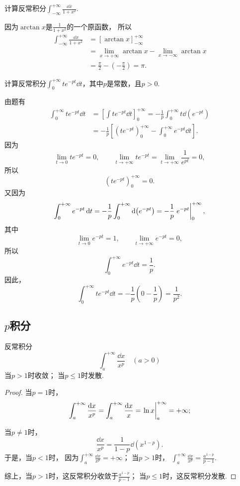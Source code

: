 \begin{example}
计算反常积分\(\int_{-\infty}^{+\infty} \frac{\dd{x}}{1+x^2}\).
\begin{solution}
因为\(\arctan x\)是\(\frac{1}{1+x^2}\)的一个原函数，
所以\[
	\begin{split}
		\int_{-\infty}^{+\infty} \frac{\dd{x}}{1+x^2}
		&= [\arctan x]_{-\infty}^{+\infty} \\
		&= \lim_{x\to+\infty} \arctan x
			-\lim_{x\to-\infty} \arctan x \\
		&= \frac{\pi}{2} - \left(-\frac{\pi}{2}\right) = \pi.
	\end{split}
\]
\end{solution}
\end{example}

\begin{example}
计算反常积分\(\int_0^{+\infty} t e^{-pt} \dd{t}\)，其中\(p\)是常数，且\(p>0\).
\begin{solution}
由题有\begin{align*}
	\int_0^{+\infty} t e^{-pt} \dd{t}
	&= \left[ \int t e^{-pt} \dd{t} \right]_0^{+\infty}
	= -\frac{1}{p} \int_0^{+\infty} t \dd(e^{-pt}) \\
	&= -\frac{1}{p} \left[
			\left( t e^{-pt} \right)_0^{+\infty}
			- \int_0^{+\infty} e^{-pt} \dd{t}
		\right].
\end{align*}
因为\[
	\lim_{t\to0} t e^{-pt} = 0, \qquad
	\lim_{t\to+\infty} t e^{-pt}
	= \lim_{t\to+\infty} \frac{1}{e^{pt}}
	= 0,
\]
所以\[
	\left( t e^{-pt} \right)_0^{+\infty}
	= 0.
\]
又因为\[
	\int_0^{+\infty} e^{-pt} \dd{t}
	= -\frac{1}{p} \int_0^{+\infty} \dd(e^{-pt})
	= -\frac{1}{p} \eval{e^{-pt}}_0^{+\infty},
\]
其中\[
	\lim_{t\to0} e^{-pt} = 1, \qquad
	\lim_{t\to+\infty} e^{-pt} = 0,
\]
所以\[
	\int_0^{+\infty} e^{-pt} \dd{t}
	= \frac{1}{p}.
\]
因此，\[
	\int_0^{+\infty} t e^{-pt} \dd{t}
	= -\frac{1}{p} \left(
			0 - \frac{1}{p}
		\right)
	= \frac{1}{p^2}.
\]
\end{solution}
\end{example}

\subsection{\texorpdfstring{\(p\)}{p}积分}
\begin{proposition}[\(p\)积分]\label{example:定积分.p积分}
反常积分\[
\int_a^{+\infty} \frac{\dd{x}}{x^p} \quad(a>0)
\]
当\(p > 1\)时收敛；
当\(p \leq 1\)时发散.
\begin{proof}
当\(p=1\)时，\[
	\int_a^{+\infty} \frac{\dd{x}}{x^p}
	= \int_a^{+\infty} \frac{\dd{x}}{x}
	= \eval{\ln x}_a^{+\infty}
	= +\infty;
\]

当\(p\neq1\)时，\[
	\frac{\dd{x}}{x^p}
	= \frac{1}{1-p} \dd(x^{1-p}).
\]
于是，当\(p<1\)时，
因为\(\int_a^{+\infty} \frac{\dd{x}}{x^p}
= +\infty\)；
当\(p>1\)时，
\(\int_a^{+\infty} \frac{\dd{x}}{x^p}
= \frac{a^{1-p}}{p-1}\).

综上，当\(p > 1\)时，这反常积分收敛于\(\frac{a^{1-p}}{p-1}\)；
当\(p\leq1\)时，这反常积分发散.
\end{proof}
\end{proposition}


